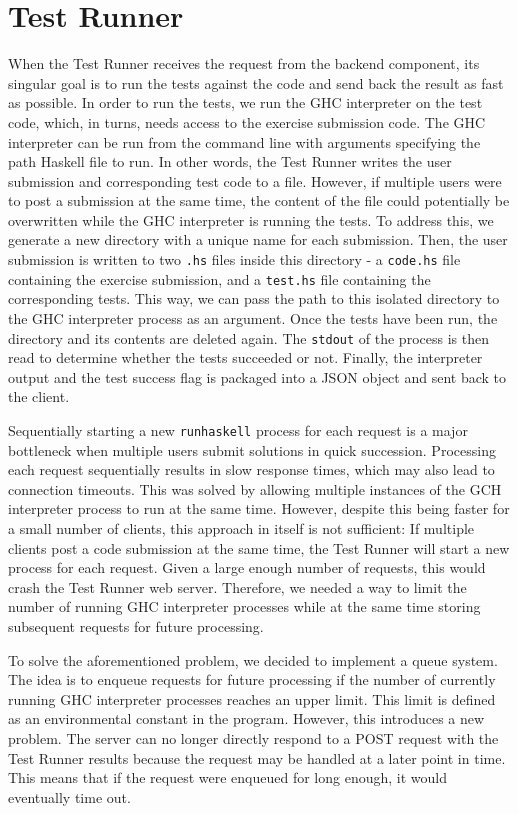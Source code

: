 \chapter{Test Runner} \label{chap:TestRunner}
When the Test Runner receives the request from the backend component, its singular goal is to run the tests against the code and send back the result as fast as possible.
In order to run the tests, we run the GHC interpreter on the test code, which, in turns, needs access to the exercise submission code.
The GHC interpreter can be run from the command line with arguments specifying the path Haskell file to run.
In other words, the Test Runner writes the user submission and corresponding test code to a file.
However, if multiple users were to post a submission at the same time, the content of the file could potentially be overwritten while the GHC interpreter is running the tests.
To address this, we generate a new directory with a unique name for each submission.
Then, the user submission is written to two  \texttt{.hs} files inside this directory - a \texttt{code.hs} file containing the exercise submission, and a \texttt{test.hs} file containing the corresponding tests.
This way, we can pass the path to this isolated directory to the GHC interpreter process as an argument.
Once the tests have been run, the directory and its contents are deleted again.
The \texttt{stdout} of the process is then read to determine whether the tests succeeded or not.
Finally, the interpreter output and the test success flag is packaged into a JSON object and sent back to the client.

Sequentially starting a new \texttt{runhaskell} process for each request is a major bottleneck when multiple users submit solutions in quick succession.
Processing each request sequentially results in slow response times, which may also lead to connection timeouts.
This was solved by allowing multiple instances of the GCH interpreter process to run at the same time.
However, despite this being faster for a small number of clients, this approach in itself is not sufficient:
If multiple clients post a code submission at the same time, the Test Runner will start a new process for each request.
Given a large enough number of requests, this would crash the Test Runner web server.
Therefore, we needed a way to limit the number of running GHC interpreter processes while at the same time storing subsequent requests for future processing.

To solve the aforementioned problem, we decided to implement a queue system.
The idea is to enqueue requests for future processing if the number of currently running GHC interpreter processes reaches an upper limit.
This limit is defined as an environmental constant in the program.
However, this introduces a new problem.
The server can no longer directly respond to a POST request with the Test Runner results because the request may be handled at a later point in time.
This means that if the request were enqueued for long enough, it would eventually time out.



